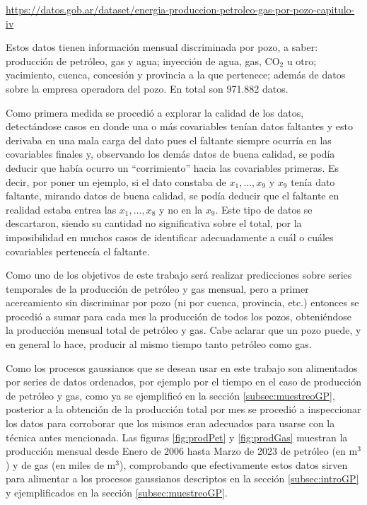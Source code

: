 \documentclass[a4paper]{article}
\begin{document}
\url{https://datos.gob.ar/dataset/energia-produccion-petroleo-gas-por-pozo-capitulo-iv}

Estos datos tienen información mensual discriminada por pozo, a saber: producción de petróleo, gas y agua; inyección de agua, gas, CO$_2$ u otro; yacimiento, cuenca, concesión y provincia a la que pertenece; además de datos sobre la empresa operadora del pozo. En total son 971.882 datos.

Como primera medida se procedió a explorar la calidad de los datos, detectándose casos en donde una o más covariables tenían datos faltantes y esto derivaba en una mala carga del dato pues el faltante siempre ocurría en las covariables finales y, observando los demás datos de buena calidad, se podía deducir que había ocurro un ``corrimiento'' hacia las covariables primeras. Es decir, por poner un ejemplo, si el dato constaba de $x_1,\dots,x_9$ y $x_9$ tenía dato faltante, mirando datos de buena calidad, se podía deducir que el faltante en realidad estaba entrea las $x_1,\dots,x_8$ y no en la $x_9$. Este tipo de datos se descartaron, siendo su cantidad no significativa sobre el total, por la imposibilidad en muchos casos de identificar adecuadamente a cuál o cuáles covariables pertenecía el faltante.

Como uno de los objetivos de este trabajo será realizar predicciones sobre series temporales de la producción de petróleo y gas mensual, pero a primer acercamiento sin discriminar por pozo (ni por cuenca, provincia, etc.) entonces se procedió a sumar para cada mes la producción de todos los pozos, obteniéndose la producción mensual total de petróleo y gas. Cabe aclarar que un pozo puede, y en general lo hace, producir al mismo tiempo tanto petróleo como gas.

Como los procesos gaussianos que se desean usar en este trabajo son alimentados por series de datos ordenados, por ejemplo por el tiempo en el caso de producción de petróleo y gas, como ya se ejemplificó en la sección \ref{subsec:muestreoGP}, posterior a la obtención de la producción total por mes se procedió a inspeccionar los datos para corroborar que los mismos eran adecuados para usarse con la técnica antes mencionada. Las figuras \ref{fig:prodPet} y \ref{fig:prodGas} muestran la producción mensual desde Enero de 2006 hasta Marzo de 2023 de petróleo (en m$^3$) y de gas (en miles de m$^3$), comprobando que efectivamente estos datos sirven para alimentar a los procesos gaussianos descriptos en la sección \ref{subsec:introGP} y ejemplificados en la sección \ref{subsec:muestreoGP}.
\end{document}
